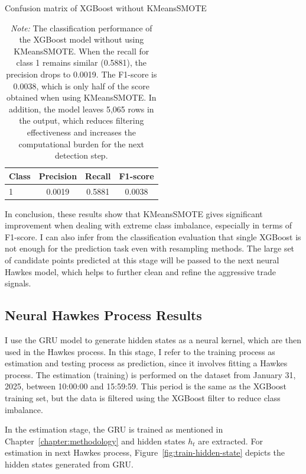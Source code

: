 \begin{table}[H]
    \centering
    \caption{Confusion matrix of XGBoost without KMeansSMOTE}
    \caption*{\textit{Note:} The classification performance of the XGBoost model without using KMeansSMOTE. When the recall for class 1 remains similar (0.5881), the precision drops to 0.0019. The F1-score is 0.0038, which is only half of the score obtained when using KMeansSMOTE. In addition, the model leaves 5,065 rows in the output, which reduces filtering effectiveness and increases the computational burden for the next detection step.}
    \label{tab:xgb-noKM}
    \begin{tabular}{lccc}
        \toprule
        Class & Precision & Recall & F1-score\\
        \midrule
        1 & 0.0019 & 0.5881 & 0.0038 \\        
        \bottomrule
    \end{tabular}
\end{table}

In conclusion, these results show that KMeansSMOTE gives significant improvement when dealing with extreme class imbalance, especially in terms of F1-score. I can also infer from the classification evaluation that single XGBoost is not enough for the prediction task even with resampling methods. The large set of candidate points predicted at this stage will be passed to the next neural Hawkes model, which helps to further clean and refine the aggressive trade signals. 

\newpage

\subsection{Neural Hawkes Process Results}
I use the GRU model to generate hidden states as a neural kernel, which are then used in the Hawkes process. In this stage, I refer to the training process as estimation and testing process as prediction, since it involves fitting a Hawkes process. The estimation (training) is performed on the dataset from January 31, 2025, between 10:00:00 and 15:59:59. This period is the same as the XGBoost training set, but the data is filtered using the XGBoost filter to reduce class imbalance.

In the estimation stage, the GRU is trained as mentioned in Chapter~\ref{chapter:methodology} and hidden states $h_t$ are extracted. For estimation in next Hawkes process, Figure~\ref{fig:train-hidden-state} depicts the hidden states generated from GRU.

